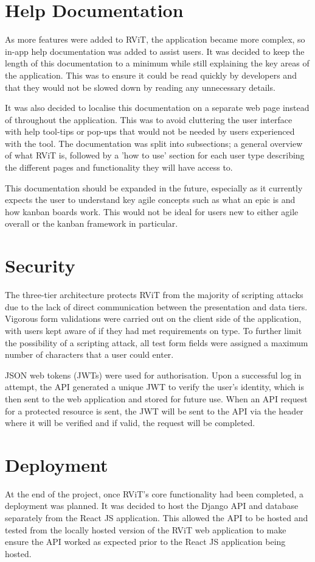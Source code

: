 \documentclass[l4proj.tex]{subfiles}
\begin{document}
\section{Help Documentation}
As more features were added to RViT, the application became more complex, so in-app help documentation was added to assist users. It was decided to keep the length of this documentation to a minimum while still explaining the key areas of the application. This was to ensure it could be read quickly by developers and that they would not be slowed down by reading any unnecessary details. 

It was also decided to localise this documentation on a separate web page instead of throughout the application. This was to avoid cluttering the user interface with help tool-tips or pop-ups that would not be needed by users experienced with the tool. The documentation was split into subsections; a general overview of what RViT is, followed by a 'how to use' section for each user type describing the different pages and functionality they will have access to.

This documentation should be expanded in the future, especially as it currently expects the user to understand key agile concepts such as what an epic is and how kanban boards work. This would not be ideal for users new to either agile overall or the kanban framework in particular. 

\section{Security}
The three-tier architecture protects RViT from the majority of scripting attacks due to the lack of direct communication between the presentation and data tiers. Vigorous form validations were carried out on the client side of the application, with users kept aware of if they had met requirements on type. To further limit the possibility of a scripting attack, all test form fields were assigned a maximum number of characters that a user could enter.

JSON web tokens (JWTs) were used for authorisation. Upon a successful log in attempt, the API generated a unique JWT to verify the user's identity, which is then sent to the web application and stored for future use. When an API request for a protected resource is sent, the JWT will be sent to the API via the header where it will be verified and if valid, the request will be completed.  

\section{Deployment}
At the end of the project, once RViT's core functionality had been completed, a deployment was planned. It was decided to host the Django API and database separately from the React JS application. This allowed the API to be hosted and tested from the locally hosted version of the RViT web application to make ensure the API worked as expected prior to the React JS application being hosted.
\end{document}
